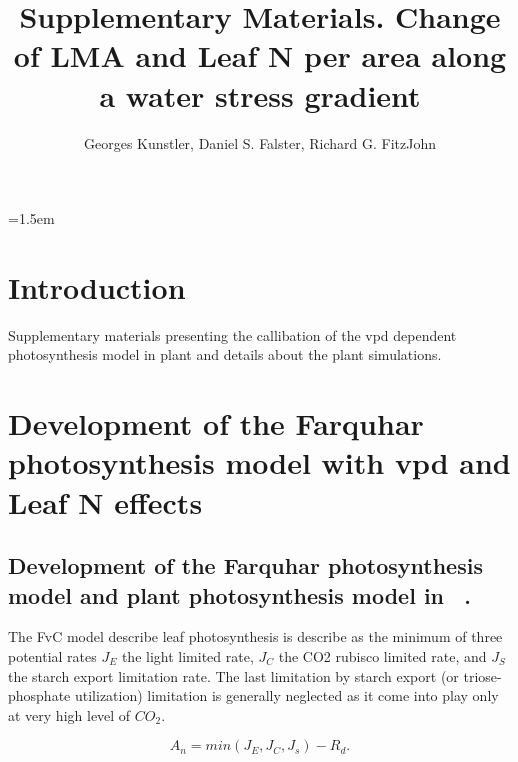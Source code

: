 \documentclass[a4paper,11pt]{article}
\title{Supplementary Materials. Change of LMA and Leaf N per area along a water stress gradient}
\author{Georges Kunstler, Daniel S. Falster, Richard G. FitzJohn}
\date{}
\affiliation{INRAE LESSEM, Grenoble, France and Department of Biological Sciences, Macquarie University,
  Sydney, Australia}
\date{}
\begin{document}
\mstitleshort
\parindent=1.5em
\addtolength{\parskip}{.3em}


\section{Introduction}

Supplementary materials presenting the callibation of the vpd dependent photosynthesis model in plant and details about the plant simulations.

\section{Development of the Farquhar photosynthesis model with vpd and Leaf N effects}


\subsection{Development of the Farquhar photosynthesis model and plant photosynthesis model in \plant\ .}

The FvC model describe leaf photosynthesis is describe as the minimum
of three potential rates $J_E$ the light limited rate, $J_C$ the CO2
rubisco limited rate, and $J_S$ the starch export limitation rate. The
last limitation by starch export (or triose-phosphate utilization)
limitation is generally neglected as it come into play only at very
high level of $CO_2$.

\begin{equation}
\label{eq:An}
A_n= min(J_E, J_C, J_s) - R_d.
\end{equation}


\end{document}
